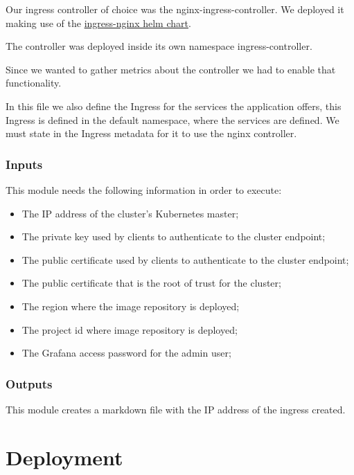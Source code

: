\documentclass[12pt,a4paper,oneside]{report}
\begin{document}
\begin{itemize}
\begin{itemize}
			Our ingress controller of choice was the nginx-ingress-controller. We deployed it making use of the \href{https://artifacthub.io/packages/helm/ingress-nginx/ingress-nginx}{ingress-nginx helm chart}.
			
			The controller was deployed inside its own namespace ingress-controller.
			
			Since we wanted to gather metrics about the controller we had to enable that functionality.
			
			In this file we also define the Ingress for the services the application offers, this Ingress is defined in the default namespace, where the services are defined. We must state in the Ingress metadata for it to use the nginx controller.
			
			
		\end{itemize}
\end{itemize}

\subsubsection{Inputs}
This module needs the following information in order to execute:
\begin{itemize}
    \item The IP address of the cluster's Kubernetes master;
    \item The private key used by clients to authenticate to the cluster endpoint;
    \item The public certificate used by clients to authenticate to the cluster endpoint;
    \item The public certificate that is the root of trust for the cluster;
    \item The region where the image repository is deployed;
    \item The project id where image repository is deployed;
    \item The Grafana access password for the admin user;
\end{itemize}

\subsubsection{Outputs}
This module creates a markdown file with the \ac{IP} address of the ingress created.
\clearpage
\section{Deployment}
\end{document}
